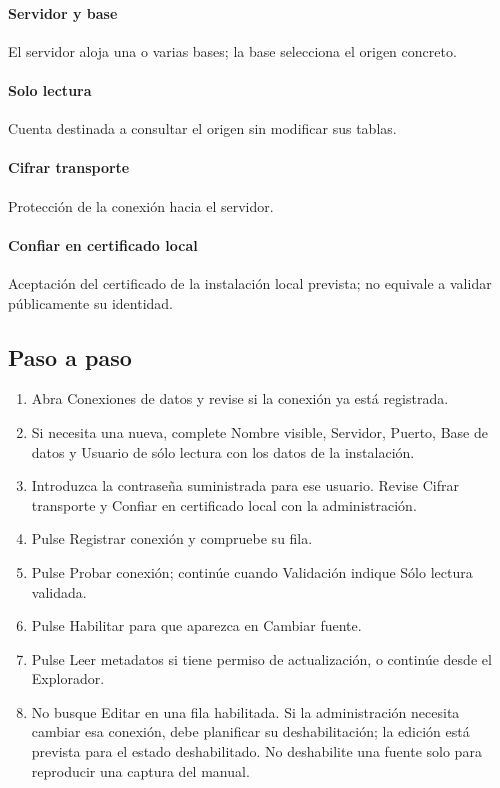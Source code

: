 \paragraph{Servidor y base} El servidor aloja una o varias bases; la base selecciona el origen concreto.

\paragraph{Solo lectura} Cuenta destinada a consultar el origen sin modificar sus tablas.

\paragraph{Cifrar transporte} Protección de la conexión hacia el servidor.

\paragraph{Confiar en certificado local} Aceptación del certificado de la instalación local prevista; no equivale a validar públicamente su identidad.

\subsection{Paso a paso}
\begin{enumerate}
\item Abra Conexiones de datos y revise si la conexión ya está registrada.
\item Si necesita una nueva, complete Nombre visible, Servidor, Puerto, Base de datos y Usuario de sólo lectura con los datos de la instalación.
\item Introduzca la contraseña suministrada para ese usuario. Revise Cifrar transporte y Confiar en certificado local con la administración.
\item Pulse Registrar conexión y compruebe su fila.
\item Pulse Probar conexión; continúe cuando Validación indique Sólo lectura validada.
\item Pulse Habilitar para que aparezca en Cambiar fuente.
\item Pulse Leer metadatos si tiene permiso de actualización, o continúe desde el Explorador.
\item No busque Editar en una fila habilitada. Si la administración necesita cambiar esa conexión, debe planificar su deshabilitación; la edición está prevista para el estado deshabilitado. No deshabilite una fuente solo para reproducir una captura del manual.
\end{enumerate}

